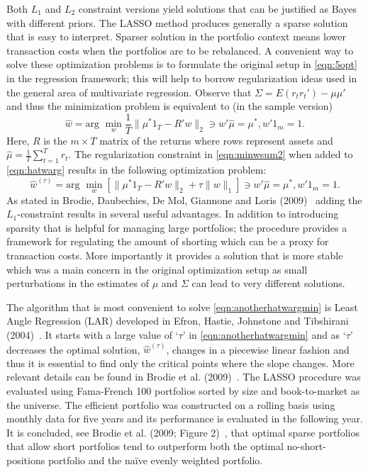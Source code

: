 Both $L_1$ and $L_2$ constraint versions yield solutions that can be justified as Bayes with different priors. The LASSO method produces generally a sparse solution that is easy to interpret. Sparser solution in the portfolio context means lower transaction costs when the portfolios are to be rebalanced. A convenient way to solve these optimization problems is to formulate the original setup in \eqref{eqn:5opt} in the regression framework; this will help to borrow regularization ideas used in the general area of multivariate regression. Observe that $\Sigma= E(r_tr_t') - \mu\mu'$ and thus the minimization problem is equivalent to (in the sample version)
	\begin{equation} \label{eqn:hatwarg}
	\hat{w}= \text{arg }\min_w \dfrac{1}{T} \| \mu^*1_T - R'w\|_2 \ni w'\hat{\mu} = \mu^*, w'1_m=1.
	\end{equation}
Here, $R$ is the $m\times T$ matrix of the returns where rows represent assets and $\hat{\mu}=\frac{1}{T}\sum_{t=1}^T r_t$. The regularization constraint in \eqref{eqn:minwsum2} when added to \eqref{eqn:hatwarg} results in the following optimization problem:
	\begin{equation}\label{eqn:anotherhatwargmin}
	\hat{w}^{(\tau)}= \text{arg } \min_w [ \|\mu^* 1_T - R'w\|_2 + \tau\|w\|_1] \ni w' \hat{\mu} = \mu^*, w'1_m=1.
	\end{equation}
As stated in Brodie, Daubechies, De Mol, Giannone and Loris (2009)~\cite{brodic} adding the $L_1$-constraint results in several useful advantages. In addition to introducing sparsity that is helpful for managing large portfolios; the procedure provides a framework for regulating the amount of shorting which can be a proxy for transaction costs. More importantly it provides a solution that is more stable which was a main concern in the original optimization setup as small perturbations in the estimates of $\mu$ and $\Sigma$ can lead to very different solutions.


The algorithm that is most convenient to solve \eqref{eqn:anotherhatwargmin} is Least Angle Regression (LAR) developed in Efron, Hastie, Johnstone and Tibshirani (2004)~\cite{efron}. It starts with a large value of `$\tau$' in \eqref{eqn:anotherhatwargmin} and as `$\tau$' decreases the optimal solution, $\hat{w}^{(\tau)}$, changes in a piecewise linear fashion and thus it is essential to find only the critical points where the slope changes. More relevant details can be found in Brodie et al. (2009)~\cite{brodic}. The LASSO procedure was evaluated using Fama-French 100 portfolios sorted by size and book-to-market as the universe. The efficient portfolio was constructed on a rolling basis using monthly data for five years and its performance is evaluated in the following year. It is concluded, see Brodie et al. (2009; Figure 2)~\cite{brodic}, that optimal sparse portfolios that allow short portfolios tend to outperform both the optimal no-short-positions portfolio and the na\"ive evenly weighted portfolio. 



